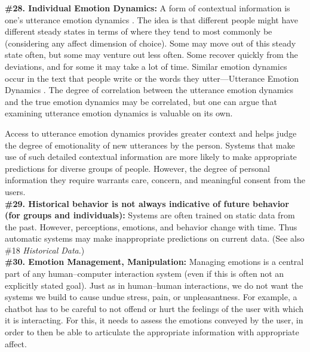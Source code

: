 \documentclass{clv3}
\begin{document}
\noindent \textbf{\#28. Individual Emotion Dynamics:} A form of contextual information is one’s utterance emotion dynamics \cite{hollenstein2015time}. The idea is that different people might have different steady states in terms of where they tend to most commonly be (considering any affect dimension of choice). Some may move out of this steady state often, but some may venture out less often. 
Some recover quickly from the deviations, and for some it may take a lot of time.
Similar emotion dynamics occur in the text that people write or the words they utter—Utterance Emotion Dynamics \cite{hipson2021emotion}. The degree of correlation between the utterance emotion dynamics and the true emotion dynamics may be correlated, but one can argue that examining utterance emotion dynamics is valuable on its own.

Access to utterance emotion dynamics provides greater context and helps judge the degree of emotionality of new utterances by the person. Systems that make use of such detailed contextual information are more likely to make appropriate predictions for diverse groups of people. However, the degree of personal information they require warrants care, concern, and meaningful consent from the users.\\


\noindent \textbf{\#29. Historical behavior is not always indicative of future behavior (for groups and individuals):} Systems are often trained on static data from the past. However, perceptions, emotions, and behavior change with time. Thus automatic systems may make inappropriate predictions on current data. (See also \#18 \textit{Historical Data}.)\\[-1pt]


\noindent \textbf{\#30. Emotion Management, Manipulation:} Managing emotions is a central part of any human--computer interaction system (even if this is often not an explicitly stated goal). Just as in human--human interactions, we do not want the systems we build to cause undue stress, pain, or unpleasantness. For example, a chatbot has to be careful to not offend or hurt the feelings of the user with which it is interacting. For this, it needs to assess the emotions conveyed by the user, in order to then be able to articulate the appropriate information with appropriate affect.
\end{document}
